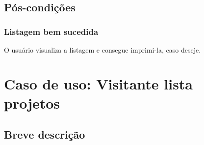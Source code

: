 \documentclass[11pt, a4paper,oneside]{book}
\begin{document}
%
%
%
%

\section{Pós-condições}

\subsection{Listagem bem sucedida}

O usuário visualiza a listagem e consegue imprimi-la, caso deseje.

%

\chapter[Caso de Uso]{Caso de uso: \bf Visitante lista projetos}
\label{cap:casodeuso}	

\section{Breve descrição}
\end{document}
